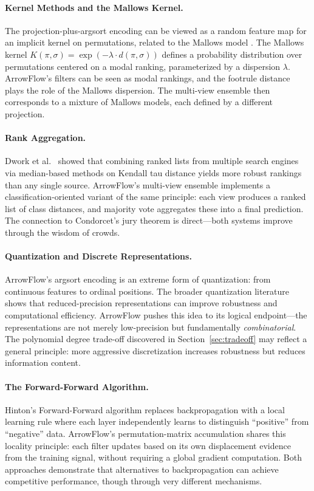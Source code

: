 \documentclass[12pt]{article}
\begin{document}
\paragraph{Kernel Methods and the Mallows Kernel.}
The projection-plus-argsort encoding can be viewed as a random feature map for an implicit kernel on permutations, related to the Mallows model \citep{mallows1957nonnull}. The Mallows kernel $K(\pi, \sigma) = \exp(-\lambda \cdot d(\pi, \sigma))$ defines a probability distribution over permutations centered on a modal ranking, parameterized by a dispersion $\lambda$. ArrowFlow's filters can be seen as modal rankings, and the footrule distance plays the role of the Mallows dispersion. The multi-view ensemble then corresponds to a mixture of Mallows models, each defined by a different projection.

\paragraph{Rank Aggregation.}
Dwork et al.\ \citep{dwork2001rank} showed that combining ranked lists from multiple search engines via median-based methods on Kendall tau distance yields more robust rankings than any single source. ArrowFlow's multi-view ensemble implements a classification-oriented variant of the same principle: each view produces a ranked list of class distances, and majority vote aggregates these into a final prediction. The connection to Condorcet's jury theorem is direct---both systems improve through the wisdom of crowds.

\paragraph{Quantization and Discrete Representations.}
ArrowFlow's argsort encoding is an extreme form of quantization: from continuous features to ordinal positions. The broader quantization literature \citep{jacob2018quantization} shows that reduced-precision representations can improve robustness and computational efficiency. ArrowFlow pushes this idea to its logical endpoint---the representations are not merely low-precision but fundamentally \emph{combinatorial}. The polynomial degree trade-off discovered in Section~\ref{sec:tradeoff} may reflect a general principle: more aggressive discretization increases robustness but reduces information content.

\paragraph{The Forward-Forward Algorithm.}
Hinton's Forward-Forward algorithm \citep{hinton2022forward} replaces backpropagation with a local learning rule where each layer independently learns to distinguish ``positive'' from ``negative'' data. ArrowFlow's permutation-matrix accumulation shares this locality principle: each filter updates based on its own displacement evidence from the training signal, without requiring a global gradient computation. Both approaches demonstrate that alternatives to backpropagation can achieve competitive performance, though through very different mechanisms.
\end{document}
